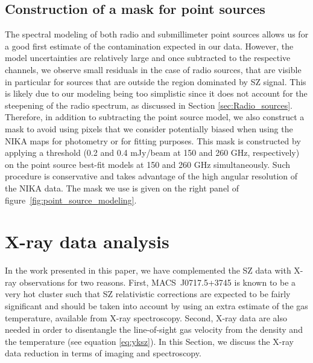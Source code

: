 \documentclass[twocolumn,traditabstract]{aa}
\begin{document}
\subsection{Construction of a mask for point sources}\label{sec:Construction_of_a_mask_for_point_sources}
The spectral modeling of both radio and submillimeter point sources allows us for a good first estimate of the contamination expected in our data. However, the model uncertainties are relatively large and once subtracted to the respective channels, we observe small residuals in the case of radio sources, that are visible in particular for sources that are outside the region dominated by SZ signal. This is likely due to our modeling being too simplistic since it does not account for the steepening of the radio spectrum, as discussed in Section \ref{sec:Radio_sources}. Therefore, in addition to subtracting the point source model, we also construct a mask to avoid using pixels that we consider potentially biased when using the NIKA maps for photometry or for fitting purposes. This mask is constructed by applying a threshold (0.2 and 0.4 mJy/beam at 150 and 260 GHz, respectively) on the point source best-fit models at 150 and 260 GHz simultaneously. Such procedure is conservative and takes advantage of the high angular resolution of the NIKA data. The mask we use is given on the right panel of figure~\ref{fig:point_source_modeling}.

\section{X-ray data analysis}\label{sec:X_ray_data_reduction}
In the work presented in this paper, we have complemented the SZ data with X-ray observations for two reasons. First, \mbox{MACS~J0717.5+3745} is known to be a very hot cluster \citep{Ma2009} such that SZ relativistic corrections are expected to be fairly significant and should be taken into account by using an extra estimate of the gas temperature, available from X-ray spectroscopy. Second, X-ray data are also needed in order to disentangle the line-of-sight gas velocity from the density and the temperature (see equation \ref{eq:yksz}). In this Section, we discuss the X-ray data reduction in terms of imaging and spectroscopy.
\end{document}
